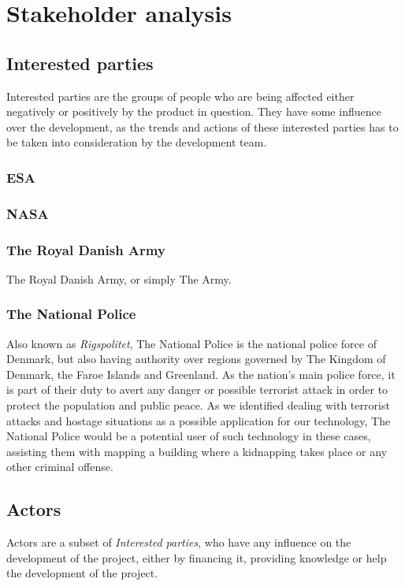 \section{Stakeholder analysis}
	
\subsection{Interested parties}
Interested parties are the groups of people who are being affected either negatively or positively by the product in question. They have some influence over the development, as the trends and actions of these interested parties has to be taken into consideration by the development team.

\subsubsection{ESA}

\subsubsection{NASA}

\subsubsection{The Royal Danish Army}
The Royal Danish Army, or simply The Army.

\subsubsection{The National Police}
Also known as \textit{Rigspolitet}\cite{Police}, The National Police is the national police force of Denmark, but also having authority over regions governed by The Kingdom of Denmark, the Faroe Islands and Greenland. As the nation's main police force, it is part of their duty to avert any danger or possible terrorist attack in order to protect the population and public peace. As we identified dealing with terrorist attacks and hostage situations as a possible application for our technology, The National Police would be a potential user of such technology in these cases, assisting them with mapping a building where a kidnapping takes place or any other criminal offense.

\subsection{Actors}
Actors are a subset of \textit{Interested parties}, who have any influence on the development of the project, either by financing it, providing knowledge or help the development of the project.
	
